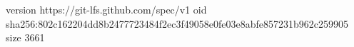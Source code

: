 version https://git-lfs.github.com/spec/v1
oid sha256:802c162204dd8b2477723484f2ec3f49058e0fe03e8abfe857231b962c259905
size 3661
